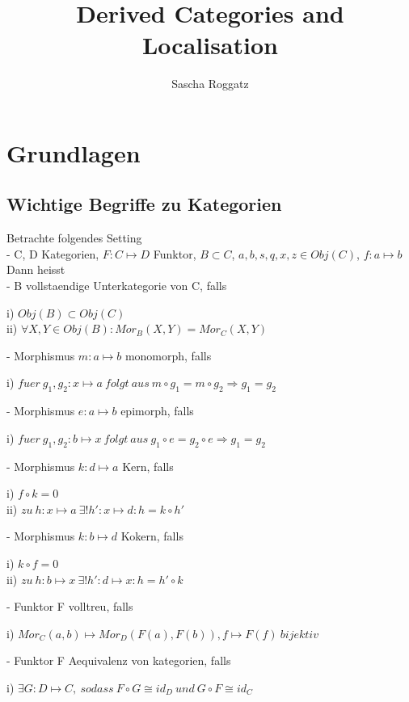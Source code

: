 \documentclass[12pt]{article}
\begin{document}
\title{Derived Categories and Localisation}
\author{Sascha Roggatz}
\maketitle
\tableofcontents
\newpage

\section{Grundlagen}
\subsection{Wichtige Begriffe zu Kategorien}

Betrachte folgendes Setting\\
- C, D Kategorien, $F : C \mapsto D$ Funktor, $B \subset C$, $a,b,s,q,x,z \in Obj(C)$, $f : a \mapsto b$ \\
\newline
Dann heisst\\
- B  vollstaendige Unterkategorie von C, falls
\begin{description}
    \item[i) $Obj(B) \subset Obj(C)$]
    \item[ii) $\forall X,Y \in Obj(B): Mor_B(X,Y) = Mor_C(X,Y)$]  
\end{description}
- Morphismus $m : a \mapsto b$ monomorph, falls
\begin{description}
    \item[i) $fuer \: g_1,g_2 : x \mapsto a \: folgt \: aus \: m \circ g_1 = m \circ g_2 \Rightarrow g_1 = g_2$] 
\end{description}
- Morphismus $e : a \mapsto b$ epimorph, falls
\begin{description}
    \item[i) $fuer \: g_1,g_2 : b \mapsto x \: folgt \: aus \: g_1 \circ e = g_2 \circ e \Rightarrow g_1 = g_2$] 
\end{description}
- Morphismus $k : d \mapsto a$ Kern, falls
\begin{description}
    \item[i) $f \circ k = 0$]
    \item[ii) $zu \: h : x \mapsto a \: \exists ! h' : x \mapsto d: h = k \circ h'$] 
\end{description}
- Morphismus $k : b \mapsto d$ Kokern, falls
\begin{description}
    \item[i) $k \circ f = 0$]
    \item[ii) $zu \: h : b \mapsto x \: \exists ! h' : d \mapsto x: h = h' \circ k$] 
\end{description}
- Funktor F  volltreu, falls 
\begin{description}
    \item[i) $Mor_C(a,b) \mapsto Mor_D(F(a),F(b)), f \mapsto F(f) \: bijektiv$] 
\end{description}
- Funktor F  Aequivalenz von kategorien, falls
\begin{description}
    \item[i) $\exists G : D \mapsto C, \: sodass \: F \circ G \cong id_D \: und \: G \circ F \cong id_C$] 
\end{description}
\end{document}
